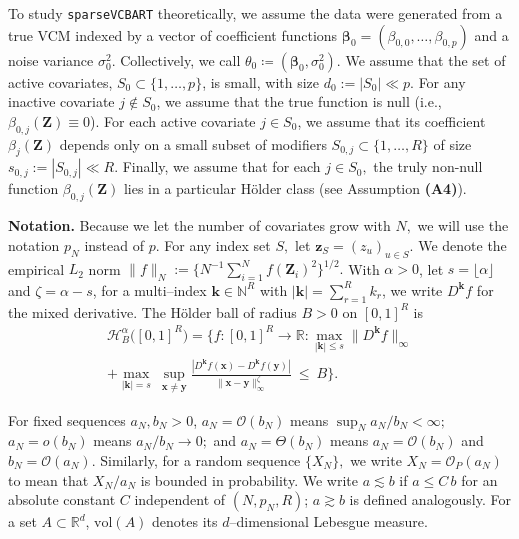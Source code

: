 \documentclass[11pt]{article}
\newcommand{\bz}{\bm{z}}
\newcommand{\bZ}{\bm{Z}}
\newcommand{\bbeta}{\boldsymbol{\beta}}
\theoremstyle{plain}
\theoremstyle{definition}
\theoremstyle{plain}
\begin{document}
To study \texttt{sparseVCBART} theoretically, we assume the data were generated from a true VCM indexed by a vector of coefficient functions $\bbeta_0 = (\beta_{0,0}, \dots, \beta_{0,p})$ and a noise variance $\sigma_0^2$. Collectively, we call $\theta_0 \coloneqq (\bbeta_0, \sigma_0 ^2)$. We assume that the set of active covariates, $S_0 \subset \{1, \dots, p\}$, is small, with size $d_0 := |S_0| \ll p$. 
For any inactive covariate $j \notin S_0$, we assume that the true function is null (i.e., $\beta_{0,j}(\bZ) \equiv 0$). 
For each active covariate $j \in S_0$, we assume that its coefficient $\beta_{j}(\bZ)$ depends only on a small subset of modifiers $S_{0,j} \subset \{1, \ldots, R\}$ of size $s_{0,j} := |S_{0,j}| \ll R$. 
Finally, we assume that for each $j \in S_{0},$ the truly non-null function $\beta_{0,j}(\bZ)$ lies in a particular H\"{o}lder class (see Assumption \textbf{(A4)}).

\textbf{Notation.} Because we let the number of covariates grow with $N,$ we will use the notation $p_{N}$ instead of $p.$
For any index set $S,$ let $\bz_{S} = (z_{u})_{u \in S}.$
We denote the empirical $L_{2}$ norm $\|f\|_N:=\{N^{-1}\sum_{i=1}^N f(\bm Z_i)^2\}^{1/2}.$
With $\alpha>0$, let $s=\lfloor\alpha\rfloor$ and $\zeta=\alpha-s$, for a multi–index $\bm{k}\in\mathbb N^R$ with $|\bm{k}|=\sum_{r=1}^{R} k_r$, we write $D^{\bm{k}} f$ for the mixed derivative. 
The H\"older ball of radius $B>0$ on $[0,1]^R$ is
\begin{equation*}
\begin{split}
\mathcal H_B^{\alpha}\big([0,1]^R\big)
=
\Big\{ f:[0,1]^R\!\to\!\mathbb R :
\max_{|\bm{k}|\le s}\|D^{\bm{k}} f\|_\infty \\+
\max_{|\bm{k}|=s}\ \sup_{\bm{x}\neq \bm{y}}
\frac{|D^{\bm{k}} f(\bm{x})-D^{\bm{k}} f(\bm{y})|}{\|\bm{x}-\bm{y}\|_\infty^{\zeta}}
\ \le\ B \Big\}.
\end{split}
\end{equation*}

For fixed sequences $a_N,b_N>0$, $a_N=\mathcal O(b_N)$ means $\sup_N a_N/b_N<\infty;$ $a_N=o(b_N)$ means $a_N/b_N\to0;$ and $a_N=\Theta(b_N)$ means $a_N=\mathcal O(b_N)$ and $b_N=\mathcal O(a_N)$. 
Similarly, for a random sequence $\{X_{N}\},$ we write $X_{N} = \mathcal{O}_{P}(a_{N})$ to mean that $X_{N}/a_{N}$ is bounded in probability.
We write $a\lesssim b$ if $a\le C\,b$ for an absolute constant $C$ independent of $(N,p_N,R)$; $a\gtrsim b$ is defined analogously. For a set $A\subset\mathbb R^d$, $\mathrm{vol}(A)$ denotes its $d$–dimensional Lebesgue measure.
\end{document}
